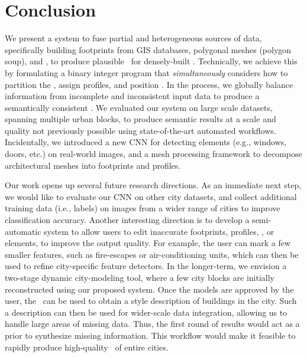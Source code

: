 



\section{Conclusion}
\label{sec:conclusion}


We present a system to fuse partial and heterogeneous sources of data, specifically building footprints from GIS databases, polygonal meshes (polygon soup), and \streetI, to produce 
plausible \outputMs\ for densely-built \blocks.  Technically, we achieve this by formulating a binary integer program that {\em simultaneously} considers how to partition the \groundplane, assign profiles, and position \buildingfacades.
In the process, we globally balance information from  
incomplete and inconsistent input data to produce a semantically consistent \outputM. We evaluated our system on large scale datasets, spanning multiple urban blocks, to produce semantic results at a scale and quality not previously possible using state-of-the-art automated workflows. 
Incidentally, we introduced a new CNN for detecting \facade elements (e.g., windows, doors, etc.) on real-world images, and a mesh processing framework to decompose architectural meshes into footprints and profiles.

Our work opens up several future research directions. As an immediate next step, we would like to evaluate our CNN on other city datasets, and collect additional training data (i.e., labels) on \facade images from a wider range of cities to improve classification accuracy.  
Another interesting direction is to develop a semi-automatic system to allow users to edit inaccurate footprints, profiles, \buildingfacades, or \facade elements, to improve the output quality. For example, the user can mark a few smaller features, such as fire-escapes or air-conditioning units, which can then be used to refine city-specific feature detectors. In the longer-term, we envision a two-stage dynamic city-modeling tool, where a few city blocks are initially reconstructed using our proposed system. Once the models are approved by the user, the \outputM\ can be used to obtain a style description of buildings in the city. Such a description can then be used for wider-scale data integration, allowing us to handle large areas of missing data. Thus, the first round of results would act as a prior to synthesize missing information. This workflow would make it feasible to rapidly produce high-quality \outputMs\ of entire cities. 


